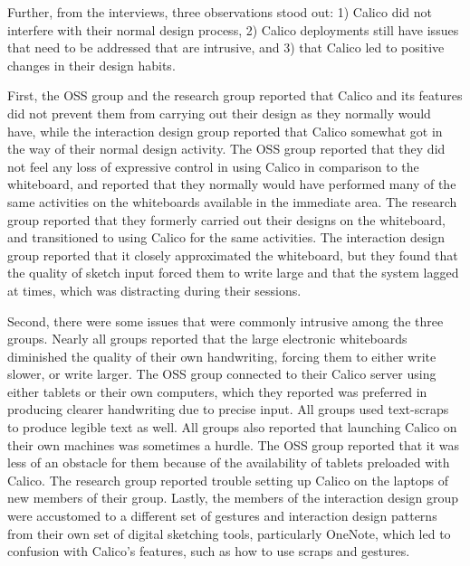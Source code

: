\documentclass[12pt,fleqn]{ucithesis}
\begin{document}
Further, from the interviews, three observations stood out: 1) Calico did not interfere with their normal design process, 2) Calico deployments still have issues that need to be addressed that are intrusive, and 3) that Calico led to positive changes in their design habits.

First, the OSS group and the research group reported that Calico and its features did not prevent them from carrying out their design as they normally would have, while the interaction design group reported that Calico somewhat got in the way of their normal design activity. The OSS group reported that they did not feel any loss of expressive control in using Calico in comparison to the whiteboard, and reported that they normally would have performed many of the same activities on the whiteboards available in the immediate area. The research group reported that they formerly carried out their designs on the whiteboard, and transitioned to using Calico for the same activities. The interaction design group reported that it closely approximated the whiteboard, but they found that the quality of sketch input forced them to write large and that the system lagged at times, which was distracting during their sessions.


Second, there were some issues that were commonly intrusive among the three groups. Nearly all groups reported that the large electronic whiteboards diminished the quality of their own handwriting, forcing them to either write slower, or write larger. The OSS group connected to their Calico server using either tablets or their own computers, which they reported was preferred in producing clearer handwriting due to precise input. All groups used text-scraps to produce legible text as well. All groups also reported that launching Calico on their own machines was sometimes a hurdle. The OSS group reported that it was less of an obstacle for them because of the availability of tablets preloaded with Calico. The research group reported trouble setting up Calico on the laptops of new members of their group. Lastly, the members of the interaction design group were accustomed to a different set of gestures and interaction design patterns from their own set of digital sketching tools, particularly OneNote, which led to confusion with Calico's features, such as how to use scraps and gestures.
\end{document}
